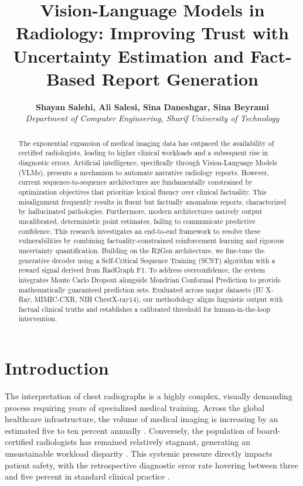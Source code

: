\documentclass[10pt,a4paper,twocolumn]{article}
\title{
    \vspace{-1.5cm}
    \textbf{\Large Vision-Language Models in Radiology: Improving Trust with\\ Uncertainty Estimation and Fact-Based Report Generation}
}
\author{
    \textbf{Shayan Salehi, Ali Salesi, Sina Daneshgar, Sina Beyrami}\\
    \textit{Department of Computer Engineering, Sharif University of Technology}\\
}
\date{}
\begin{document}
\maketitle

\begin{abstract}
The exponential expansion of medical imaging data has outpaced the availability of certified radiologists, leading to higher clinical workloads and a subsequent rise in diagnostic errors. Artificial intelligence, specifically through Vision-Language Models (VLMs), presents a mechanism to automate narrative radiology reports. However, current sequence-to-sequence architectures are fundamentally constrained by optimization objectives that prioritize lexical fluency over clinical factuality. This misalignment frequently results in fluent but factually anomalous reports, characterized by hallucinated pathologies. Furthermore, modern architectures natively output uncalibrated, deterministic point estimates, failing to communicate predictive confidence. This research investigates an end-to-end framework to resolve these vulnerabilities by combining factuality-constrained reinforcement learning and rigorous uncertainty quantification. Building on the R2Gen architecture, we fine-tune the generative decoder using a Self-Critical Sequence Training (SCST) algorithm with a reward signal derived from RadGraph F1. To address overconfidence, the system integrates Monte Carlo Dropout alongside Mondrian Conformal Prediction to provide mathematically guaranteed prediction sets. Evaluated across major datasets (IU X-Ray, MIMIC-CXR, NIH ChestX-ray14), our methodology aligns linguistic output with factual clinical truths and establishes a calibrated threshold for human-in-the-loop intervention.
\end{abstract}

\section{Introduction}
\label{sec:intro}

The interpretation of chest radiographs is a highly complex, visually demanding process requiring years of specialized medical training. Across the global healthcare infrastructure, the volume of medical imaging is increasing by an estimated five to ten percent annually \cite{johnson2019mimic}. Conversely, the population of board-certified radiologists has remained relatively stagnant, generating an unsustainable workload disparity \cite{boag2020baselines}. This systemic pressure directly impacts patient safety, with the retrospective diagnostic error rate hovering between three and five percent in standard clinical practice \cite{wang2017chestxray14}. 
\end{document}
